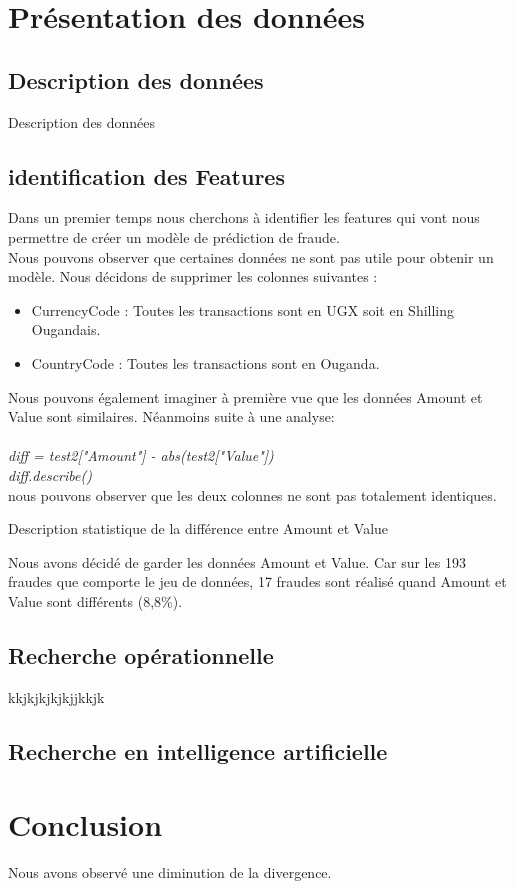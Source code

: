 \documentclass{article}
\begin{document}
\section{Présentation des données}
\subsection{Description des données}

\begin{table}[h]
\centering
{}
\caption{Description des données}
\end{table}

\subsection{identification des Features}
Dans un premier temps nous cherchons à identifier les features qui vont nous permettre de créer un modèle de prédiction de fraude.\\

Nous pouvons observer que certaines données ne sont pas utile pour obtenir un modèle. 
Nous décidons de supprimer les colonnes suivantes :
\begin{itemize}
    \item CurrencyCode : Toutes les transactions sont en UGX soit en Shilling Ougandais.
    \item CountryCode : Toutes les transactions sont en Ouganda.
\end{itemize} 
Nous pouvons également imaginer à première vue que les données Amount et Value sont similaires.
Néanmoins suite à une analyse: \\ \\
\emph{diff = test2["Amount"] - abs(test2["Value"])\\diff.describe()}\\

nous pouvons observer que les deux colonnes ne sont pas totalement identiques.\\
\begin{table}[h]
    \centering
    \caption{Description statistique de la différence entre Amount et Value}
        
 \end{table}

Nous avons décidé de garder les données Amount et Value. Car sur les 193 fraudes que comporte le jeu de données, 
17  fraudes sont réalisé quand Amount et Value sont différents (8,8\%).\\




\subsection{Recherche opérationnelle}

kkjkjkjkjkjjkkjk
\subsection{Recherche en intelligence artificielle}
\section{Conclusion}
Nous avons observé une diminution de la divergence.
\end{document}
